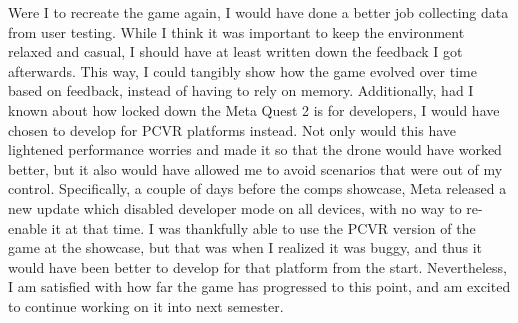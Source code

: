\documentclass[10pt,twocolumn]{article}
\begin{document}
Were I to recreate the game again, I would have done a better job collecting data from user testing. While I think it was important to keep the environment relaxed and casual, I should have at least written down the feedback I got afterwards. This way, I could tangibly show how the game evolved over time based on feedback, instead of having to rely on memory. Additionally, had I known about how locked down the Meta Quest 2 is for developers, I would have chosen to develop for PCVR platforms instead. Not only would this have lightened performance worries and made it so that the drone would have worked better, but it also would have allowed me to avoid scenarios that were out of my control. Specifically, a couple of days before the comps showcase, Meta released a new update which disabled developer mode on all devices, with no way to re-enable it at that time. I was thankfully able to use the PCVR version of the game at the showcase, but that was when I realized it was buggy, and thus it would have been better to develop for that platform from the start. Nevertheless, I am satisfied with how far the game has progressed to this point, and am excited to continue working on it into next semester.

\printbibliography 
\end{document}
